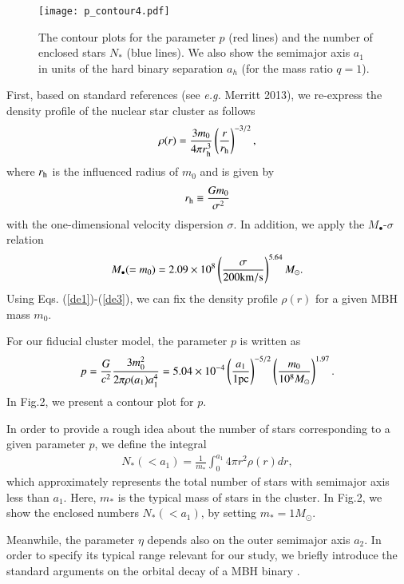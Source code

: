 \documentclass[useAMS,usenatbib,twocolumn]{mn2e}
\newcommand{\beq}{\begin{equation}}
\newcommand{\beqa}{\begin{eqnarray}}
\newcommand{\eeq}{\end{equation}}
\newcommand{\eeqa}{\end{eqnarray}}
\newcommand{\lmk}{\left(}
\newcommand{\rmk}{\right)}
\begin{document}
\begin{figure}
\begin{center}
\texttt{[image: p\_contour4.pdf]}
\caption{The contour plots for the parameter $p$ (red lines) and the number of enclosed
stars $N_{\ast}$ (blue lines). We also show the semimajor axis $a_1$ in units of
the hard binary separation  $a_h$ 
(for the mass ratio $q=1$).}
\label{fig:pcont}
\end{center}
\end{figure}



First, based on standard references (see {\it e.g.} Merritt 2013),  we re-express the  density profile of the nuclear star cluster as follows
\beqa
\rho(r)=\frac{3m_0}{4\pi r_{\rm h}^{3}}\left(\frac{r}{r_{\rm
h}}\right)^{-3/2},\label{3/2} \label{de1}
\eeqa
where $r_{\rm h}$ is the influenced radius of $m_0$ and is given by
\beq
r_{\rm h}\equiv \frac{Gm_0}{\sigma^2}\label{de2}
\eeq
 with the one-dimensional velocity
dispersion $\sigma$. In addition, we apply the
$M_{\bullet}$-$\sigma$ relation \citep{2013ApJ...764..184M}
\beq
M_{\bullet} (=m_0) =2.09\times10^8\lmk \frac\sigma{200{\rm
km/s}}\rmk^{5.64}M_{\odot}. \label{de3}
\eeq
Using Eqs. (\ref{de1})-(\ref{de3}), we can fix the density profile $\rho(r)$ for a given MBH mass
$m_0$.


For our fiducial cluster model, the parameter $p$ is written as
\beqa
p=\frac{G}{c^2}\frac{3m_{0}^2}{2\pi
\rho(a_1)a_{1}^4}=5.04\times10^{-4}\left(\frac{a_{1}}{1{\rm
pc}}\right)^{-5/2}\left(\frac{m_0}{10^8 M_{\odot}}\right)^{1.97}.
\eeqa
In Fig.2,  we present a contour  plot for $p$. 


In order to provide a rough idea about the number of stars
corresponding to a given parameter $p$, we define the integral 
\beqa
N_{\ast}(<a_1)=\frac{1}{m_\ast}\int_{0}^{a_1} 4\pi r^2 \rho(r)
dr,
\eeqa
which approximately represents the total number of stars with
semimajor axis less than $a_1$.
Here, $m_\ast$ is the typical mass of stars in the
cluster.
In Fig.2, we show the enclosed numbers  $N_{\ast}(<a_1)$,  by 
setting $m_\ast=1M_\odot$.





Meanwhile, the parameter $\eta$ depends also on the outer semimajor axis $a_2$.
 In order to specify its typical range relevant  for our
study, we briefly introduce  the standard arguments on the
orbital decay of a MBH binary \citep{merritt2013}.
\end{document}
